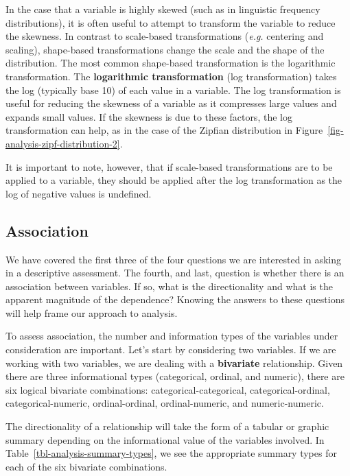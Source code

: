 \documentclass[
  letterpaper,
  krantz1]{latex/krantz-mod}
\theoremstyle{definition}
\theoremstyle{definition}
\theoremstyle{remark}
\begin{document}
In the case that a variable is highly skewed (such as in linguistic
frequency distributions), it is often useful to attempt to transform the
variable to reduce the skewness. In contrast to
scale-based transformations (\emph{e.g.} centering and scaling),
shape-based transformations change the scale and the shape of the
distribution. The most common shape-based transformation is the
logarithmic transformation. The \textbf{logarithmic transformation} (log
transformation) takes the log (typically base
10) of each value in a variable. The log transformation is useful for
reducing the skewness of a variable as it compresses large values and
expands small values. If the skewness is due to these factors, the log
transformation can help, as in the case of the Zipfian distribution in
Figure~\ref{fig-analysis-zipf-distribution-2}.

It is important to note, however, that if scale-based transformations
are to be applied to a variable, they should be applied after the log
transformation as the log of negative values is undefined.

\subsection{Association}\label{association}

We have covered the first three of the four questions we are interested
in asking in a descriptive assessment. The fourth, and last, question is
whether there is an association between variables. If so, what is the
directionality and what is the apparent magnitude of the dependence?
Knowing the answers to these questions will help frame our approach to
analysis.

To assess association, the number and information types of the variables
under consideration are important. Let's start by considering two
variables. If we are working with two variables, we are dealing with a
\textbf{bivariate} relationship. Given there
are three informational types (categorical,
ordinal, and numeric), there are six logical bivariate combinations:
categorical-categorical, categorical-ordinal, categorical-numeric,
ordinal-ordinal, ordinal-numeric, and numeric-numeric.

The directionality of a relationship will take the form of a tabular or
graphic summary depending on the informational value of the variables
involved. In Table~\ref{tbl-analysis-summary-types}, we see the
appropriate summary types for each of the six bivariate combinations.
\end{document}
